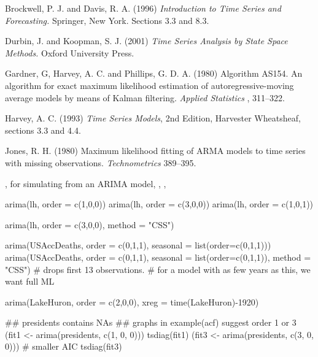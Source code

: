 \begin{References}\relax
Brockwell, P. J. and Davis, R. A. (1996) \emph{Introduction to Time
Series and Forecasting.} Springer, New York. Sections 3.3 and 8.3.

Durbin, J. and Koopman, S. J. (2001) \emph{Time Series Analysis by
State Space Methods.}  Oxford University Press.

Gardner, G, Harvey, A. C. and Phillips, G. D. A. (1980) Algorithm
AS154. An algorithm for exact maximum likelihood estimation of
autoregressive-moving average models by means of Kalman filtering.
\emph{Applied Statistics} , 311--322.

Harvey, A. C. (1993) \emph{Time Series Models},
2nd Edition, Harvester Wheatsheaf, sections 3.3 and 4.4.

Jones, R. H. (1980) Maximum likelihood fitting of ARMA models to time
series with missing observations. \emph{Technometrics}  389--395.
\end{References}
\begin{SeeAlso}\relax
{},  for simulating
from an ARIMA model, , ,
\end{SeeAlso}
\begin{Examples}
\begin{ExampleCode}
arima(lh, order = c(1,0,0))
arima(lh, order = c(3,0,0))
arima(lh, order = c(1,0,1))

arima(lh, order = c(3,0,0), method = "CSS")

arima(USAccDeaths, order = c(0,1,1), seasonal = list(order=c(0,1,1)))
arima(USAccDeaths, order = c(0,1,1), seasonal = list(order=c(0,1,1)),
      method = "CSS") # drops first 13 observations.
# for a model with as few years as this, we want full ML

arima(LakeHuron, order = c(2,0,0), xreg = time(LakeHuron)-1920)

## presidents contains NAs
## graphs in example(acf) suggest order 1 or 3
(fit1 <- arima(presidents, c(1, 0, 0)))
tsdiag(fit1)
(fit3 <- arima(presidents, c(3, 0, 0)))  # smaller AIC
tsdiag(fit3)
\end{ExampleCode}
\end{Examples}

